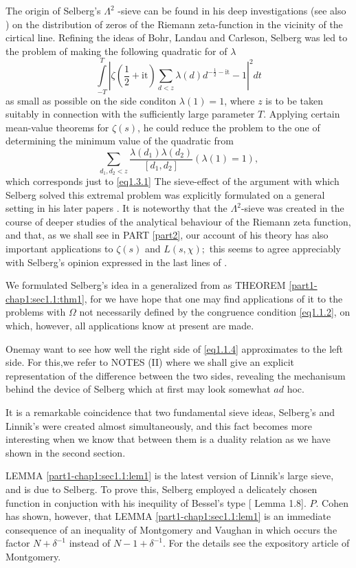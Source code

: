 The origin of Selberg's $\Lambda^2$ -sieve can be found in his deep
investigations \cite{key68} \cite{key71} (see also \cite{key70}) on the
distribution of zeros of the Riemann zeta-function in the vicinity of
the cirtical line. Refining the ideas of Bohr, Landau and Carleson,
Selberg was led\pageoriginale 
to the problem of making the following quadratic for of $\lambda$    
$$
\int\limits_{-T}^T |\zeta (\frac{1}{2} + \text{it}) \sum_{d < z}
\lambda(d)d^{-\frac{1}{2} -\text{it}} -1|^2 dt 
$$
as small as possible on the side conditon $\lambda(1) = 1$, where $z$
is to be taken suitably in connection with the sufficiently large
parameter $T$. Applying certain mean-value theorems for $\zeta (s)$,
he could reduce the problem to the one of determining the minimum
value of the quadratic from 
$$
\sum_{d_1, d_2 <z} \frac{\lambda (d_1) \lambda (d_2)} {[d_1,d_2]}
(\lambda (1) = 1), 
$$  
which corresponds just to \eqref{eq1.3.1} The sieve-effect of the argument
with which Selberg solved this extremal problem was explicitly
formulated on a general setting in his later papers \cite{key72}
\cite{key73} \cite{key74}. It
is noteworthy that the $\Lambda^2$-sieve was created in the course of
deeper studies of the analytical behaviour of the Riemann zeta
function, and that, as we shall see in PART \ref{part2}, our account of his
theory has also important applications to $\zeta(s)$ and $L(s,\chi);$
this seems to agree appreciably with Selberg's opinion expressed in
the last lines of \cite{key73} \cite{key74}.  

We formulated Selberg's idea in a generalized from as THEOREM
\ref{part1-chap1:sec1.1:thm1}, for 
we have hope that one may find applications of it to the problems with
$\Omega$ not necessarily defined by the congruence condition
\eqref{eq1.1.2}, on which, however, all applications know at present are
made.  

One\pageoriginale may want to see how well the right side of
\eqref{eq1.1.4} 
approximates 
to the left side. For this,we refer to NOTES (II) where we shall give
an explicit representation of the difference between the two sides,
revealing the mechanisum behind the device of Selberg which at first
may look somewhat $ad$ hoc.  

It is a remarkable coincidence that two fundamental sieve ideas,
Selberg's and Linnik's were created almost simultaneously, and this
fact becomes more interesting when we know that between
them is a duality relation as we have shown in the second section.  

LEMMA \ref{part1-chap1:sec1.1:lem1} is the latest version of Linnik's
large sieve, and is due to 
Selberg. To prove this, Selberg employed a delicately chosen function
in conjuction with his inequility of Bessel's type [\cite{key48} Lemma
  1.8]. $P$. Cohen has shown, however, that
LEMMA \ref{part1-chap1:sec1.1:lem1} is an 
immediate consequence of an inequality of Montgomery and Vaughan
\cite{key51} in which occurs the factor $N + \delta^{-1}$ instead of $N -1 +
\delta^{-1}$. For the details see the expository article \cite{key49} of
Montgomery.  

